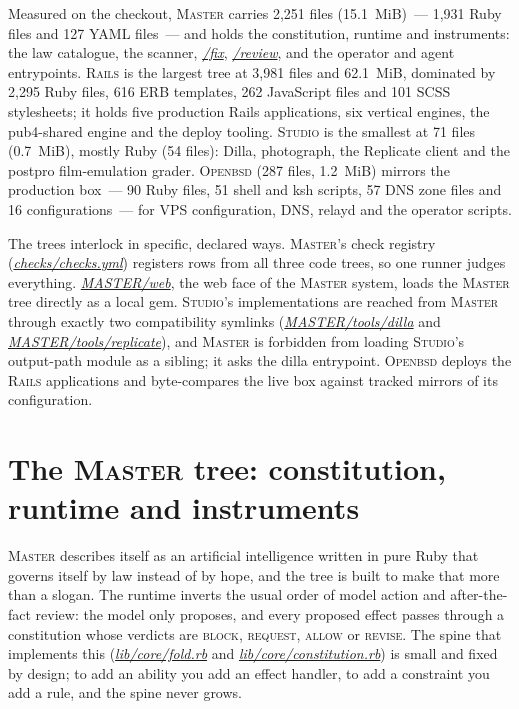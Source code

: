 \documentclass[oneside]{article}
\newcommand{\treename}[1]{\mbox{\textsc{#1}}}
\newcommand{\mtree}{\treename{Master}}
\newcommand{\rtree}{\treename{Rails}}
\newcommand{\stree}{\treename{Studio}}
\newcommand{\otree}{\treename{Openbsd}}
\newcommand{\fpath}[1]{\emph{\url{#1}}}
\begin{document}
Measured on the checkout, \mtree{} carries 2,251 files (15.1~MiB)~--- 1,931 Ruby files and 127 YAML files~--- and holds the constitution, runtime and instruments: the law catalogue, the scanner, \fpath{/fix}, \fpath{/review}, and the operator and agent entrypoints. \rtree{} is the largest tree at 3,981 files and 62.1~MiB, dominated by 2,295 Ruby files, 616 ERB templates, 262 JavaScript files and 101 SCSS stylesheets; it holds five production Rails applications, six vertical engines, the pub4-shared engine and the deploy tooling. \stree{} is the smallest at 71 files (0.7~MiB), mostly Ruby (54 files): Dilla, photograph, the Replicate client and the postpro film-emulation grader. \otree{} (287 files, 1.2~MiB) mirrors the production box~--- 90 Ruby files, 51 shell and ksh scripts, 57 DNS zone files and 16 configurations~--- for VPS configuration, DNS, relayd and the operator scripts.

The trees interlock in specific, declared ways. \mtree's check registry (\fpath{checks/checks.yml}) registers rows from all three code trees, so one runner judges everything. \fpath{MASTER/web}, the web face of the \mtree{} system, loads the \mtree{} tree directly as a local gem. \stree's implementations are reached from \mtree{} through exactly two compatibility symlinks (\fpath{MASTER/tools/dilla} and \fpath{MASTER/tools/replicate}), and \mtree{} is forbidden from loading \stree's output-path module as a sibling; it asks the dilla entrypoint. \otree{} deploys the \rtree{} applications and byte-compares the live box against tracked mirrors of its configuration.

\section{The \mtree{} tree: constitution, runtime and instruments}

\mtree{} describes itself as an artificial intelligence written in pure Ruby that governs itself by law instead of by hope, and the tree is built to make that more than a slogan. The runtime inverts the usual order of model action and after-the-fact review: the model only proposes, and every proposed effect passes through a constitution whose verdicts are \textsc{block}, \textsc{request}, \textsc{allow} or \textsc{revise}. The spine that implements this (\fpath{lib/core/fold.rb} and \fpath{lib/core/constitution.rb}) is small and fixed by design; to add an ability you add an effect handler, to add a constraint you add a rule, and the spine never grows.
\end{document}
